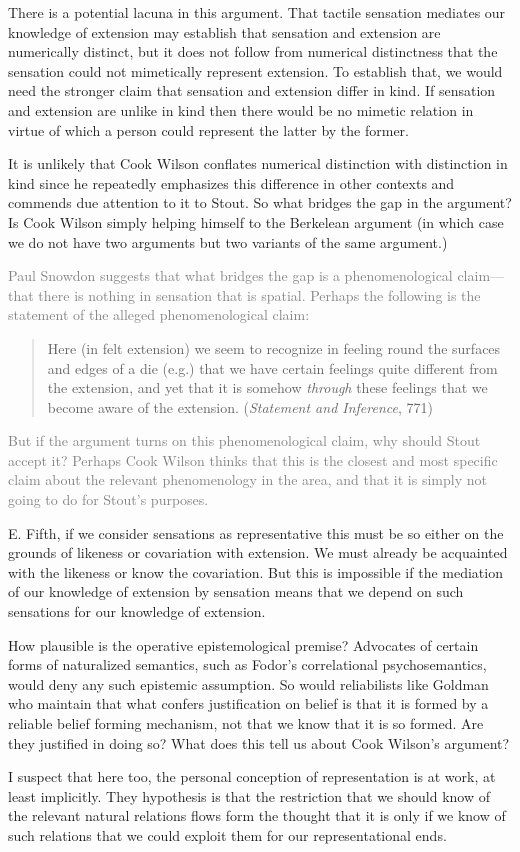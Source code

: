 \documentclass[11pt]{article}
\newcommand{\discuss}[2][gray]{\textcolor{#1}{#2}}
\begin{document}
There is a potential lacuna in this argument. That tactile sensation mediates our knowledge of extension may establish that sensation and extension are numerically distinct, but it does not follow from numerical distinctness that the sensation could not mimetically represent extension. To establish that, we would need the stronger claim that sensation and extension differ in kind. If sensation and extension are unlike in kind then there would be no mimetic relation in virtue of which a person could represent the latter by the former.

It is unlikely that Cook Wilson conflates numerical distinction with distinction in kind since he repeatedly emphasizes this difference in other contexts and commends due attention to it to Stout. So what bridges the gap in the argument? Is Cook Wilson simply helping himself to the Berkelean argument (in which case we do not have two arguments but two variants of the same argument.)

\discuss{Paul Snowdon suggests that what bridges the gap is a phenomenological claim---that there is nothing in sensation that is spatial. Perhaps the following is the statement of the alleged phenomenological claim:
\begin{quote}
	Here (in felt extension) we seem to recognize in feeling round the surfaces and edges of a die (e.g.) that we have certain feelings quite different from the extension, and yet that it is somehow \emph{through} these feelings that we become aware of the extension. (\emph{Statement and Inference}, 771)
\end{quote}
But if the argument turns on this phenomenological claim, why should Stout accept it? Perhaps Cook Wilson thinks that this is the closest and most specific claim about the relevant phenomenology in the area, and that it is simply not going to do for Stout's purposes.}

E. Fifth, if we consider sensations as representative this must be so either on the grounds of likeness or covariation with extension. We must already be acquainted with the likeness or know the covariation. But this is impossible if the mediation of our knowledge of extension by sensation means that we depend on such sensations for our knowledge of extension.

How plausible is the operative epistemological premise? Advocates of certain forms of naturalized semantics, such as Fodor's correlational psychosemantics, would deny any such epistemic assumption. So would reliabilists like Goldman who maintain that what confers justification on belief is that it is formed by a reliable belief forming mechanism, not that we know that it is so formed. Are they justified in doing so? What does this tell us about Cook Wilson's argument?

I suspect that here too, the personal conception of representation is at work, at least implicitly. They hypothesis is that the restriction that we should know of the relevant natural relations flows form the thought that it is only if we know of such relations that we could exploit them for our representational ends.

\end{document}
